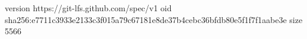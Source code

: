 version https://git-lfs.github.com/spec/v1
oid sha256:e7711c3933e2133c3f015a79c67181e8de37b4cebc36bfdb80e5f1f7f1aabe3e
size 5566
